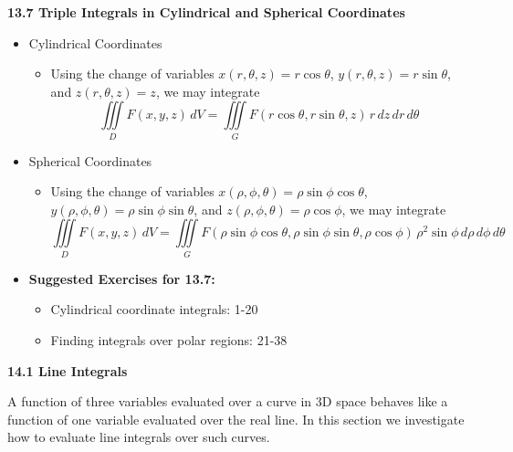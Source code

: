 \documentclass[12pt]{article}
\theoremstyle{plain}
\theoremstyle{definition}
\theoremstyle{remark}
\newcommand{\dvar}[1]{\,d{#1}}
\begin{document}
	\newpage
	
	\centerline{\bf 13.7 Triple Integrals in Cylindrical and Spherical Coordinates}
	
	\begin{itemize}
	
	\item Cylindrical Coordinates
		\begin{itemize}
		\item Using the change of variables $x(r,\theta,z)=r\cos\theta$, $y(r,\theta,z)=r\sin\theta$, and $z(r,\theta,z)=z$, we may integrate \[\iiint\limits_D F(x,y,z)\, dV = \iiint\limits_G F(r\cos\theta,r\sin\theta,z)\,r\dvar{z}\dvar{r}\dvar{\theta}\]
		\end{itemize}
	
	\item Spherical Coordinates
		\begin{itemize}
		\item Using the change of variables $x(\rho,\phi,\theta)=\rho\sin\phi\cos\theta$, $y(\rho,\phi,\theta)=\rho\sin\phi\sin\theta$, and $z(\rho,\phi,\theta)=\rho\cos\phi$, we may integrate \[\iiint\limits_D F(x,y,z)\, dV = \iiint\limits_G F(\rho\sin\phi\cos\theta,\rho\sin\phi\sin\theta,\rho\cos\phi) \,\rho^2\sin\phi\dvar{\rho}\dvar{\phi}\dvar{\theta} \]
		\end{itemize}
			
	\item \textbf{Suggested Exercises for 13.7:}
	
		\begin{itemize}
		\item Cylindrical coordinate integrals: 1-20
		\item Finding integrals over polar regions: 21-38
		\end{itemize}
	
	\end{itemize}
	
	\newpage
	
	\centerline{\bf 14.1 Line Integrals}
	
	A function of three variables evaluated over a curve in 3D space behaves like a function of one variable evaluated over the real line. In this section we investigate how to evaluate line integrals over such curves.
	
\end{document}

